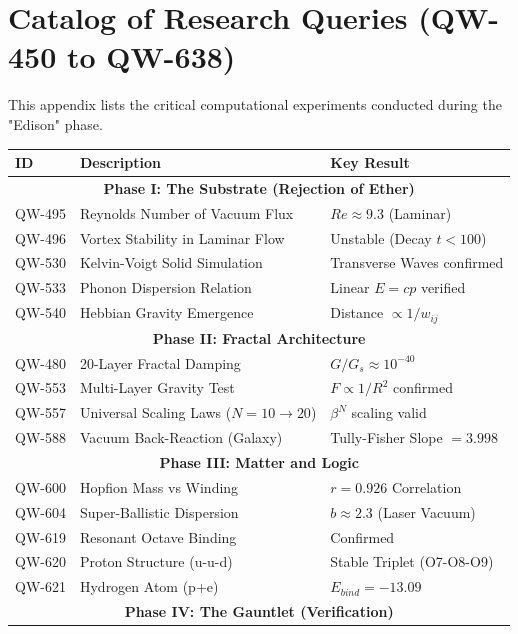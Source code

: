 \documentclass[11pt, a4paper]{report}
\begin{document}
\appendix
\chapter{Catalog of Research Queries (QW-450 to QW-638)}
\label{chap:catalog}

This appendix lists the critical computational experiments conducted during the "Edison" phase.

\begin{small}
\begin{longtable}{|p{2cm}|p{8cm}|p{4cm}|}
\hline
\textbf{ID} & \textbf{Description} & \textbf{Key Result} \\
\hline
\endhead
\hline
\multicolumn{3}{|c|}{\textbf{Phase I: The Substrate (Rejection of Ether)}} \\
\hline
QW-495 & Reynolds Number of Vacuum Flux & $Re \approx 9.3$ (Laminar) \\
QW-496 & Vortex Stability in Laminar Flow & Unstable (Decay $t < 100$) \\
QW-530 & Kelvin-Voigt Solid Simulation & Transverse Waves confirmed \\
QW-533 & Phonon Dispersion Relation & Linear $E=cp$ verified \\
QW-540 & Hebbian Gravity Emergence & Distance $\propto 1/w_{ij}$ \\
\hline
\multicolumn{3}{|c|}{\textbf{Phase II: Fractal Architecture}} \\
\hline
QW-480 & 20-Layer Fractal Damping & $G/G_s \approx 10^{-40}$ \\
QW-553 & Multi-Layer Gravity Test & $F \propto 1/R^2$ confirmed \\
QW-557 & Universal Scaling Laws ($N=10 \to 20$) & $\beta^N$ scaling valid \\
QW-588 & Vacuum Back-Reaction (Galaxy) & Tully-Fisher Slope $= 3.998$ \\
\hline
\multicolumn{3}{|c|}{\textbf{Phase III: Matter and Logic}} \\
\hline
QW-600 & Hopfion Mass vs Winding & $r = 0.926$ Correlation \\
QW-604 & Super-Ballistic Dispersion & $b \approx 2.3$ (Laser Vacuum) \\
QW-619 & Resonant Octave Binding & Confirmed \\
QW-620 & Proton Structure (u-u-d) & Stable Triplet (O7-O8-O9) \\
QW-621 & Hydrogen Atom (p+e) & $E_{bind} = -13.09$ \\
\hline
\multicolumn{3}{|c|}{\textbf{Phase IV: The Gauntlet (Verification)}} \\

\end{longtable}
\end{small}
\end{document}
